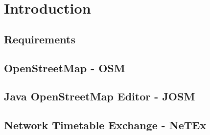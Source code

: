 \chapter{Introduction}
\lipsum[14-16]
\newpage
\section{Requirements}
\lipsum[10-12]
\newpage
\section{OpenStreetMap - OSM}
\lipsum[2-4]
\section{Java OpenStreetMap Editor - JOSM}
\lipsum[4-5]
\section{Network Timetable Exchange - NeTEx}
\lipsum[6-8]